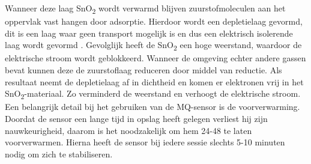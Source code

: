 Wanneer deze laag SnO\textsubscript{2} wordt verwarmd blijven zuurstofmoleculen aan het oppervlak vast hangen door adsorptie. Hierdoor wordt een depletielaag gevormd, dit is een laag waar geen transport mogelijk is en dus een elektrisch isolerende laag wordt gevormd
. Gevolglijk heeft de SnO\textsubscript{2} een hoge weerstand, waardoor de elektrische stroom wordt geblokkeerd. Wanneer de omgeving echter andere gassen bevat kunnen deze de zuurstoflaag reduceren door middel van reductie. Als resultaat neemt de depletielaag af in dichtheid en komen er elektronen vrij in het SnO\textsubscript{2}-materiaal. Zo verminderd de weerstand en verhoogt de elektrische stroom.
Een belangrijk detail bij het gebruiken van de MQ-sensor is de voorverwarming. Doordat de sensor een lange tijd in opslag heeft gelegen verliest hij zijn nauwkeurigheid, daarom is het noodzakelijk om hem 24-48 te laten voorverwarmen. Hierna heeft de sensor bij iedere sessie slechts 5-10 minuten nodig om zich te stabiliseren.

